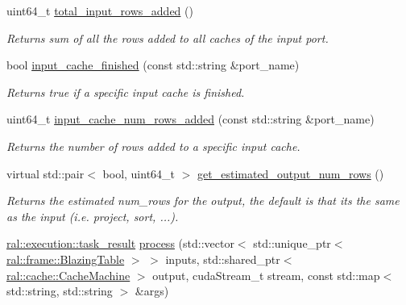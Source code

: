 \begin{DoxyCompactItemize}
\mbox{\label{classral_1_1cache_1_1kernel_a87d2048b2c50e1124eaaed09b3c18758}} 
uint64\+\_\+t \hyperlink{classral_1_1cache_1_1kernel_a87d2048b2c50e1124eaaed09b3c18758}{total\+\_\+input\+\_\+rows\+\_\+added} ()
\begin{DoxyCompactList}\small\item\em Returns sum of all the rows added to all caches of the input port. \end{DoxyCompactList}\item 
bool \hyperlink{classral_1_1cache_1_1kernel_a75d3db3d361445cd14da3186b8b15036}{input\+\_\+cache\+\_\+finished} (const std\+::string \&port\+\_\+name)
\begin{DoxyCompactList}\small\item\em Returns true if a specific input cache is finished. \end{DoxyCompactList}\item 
uint64\+\_\+t \hyperlink{classral_1_1cache_1_1kernel_a25cd1d59552733027ba6396cd9e41004}{input\+\_\+cache\+\_\+num\+\_\+rows\+\_\+added} (const std\+::string \&port\+\_\+name)
\begin{DoxyCompactList}\small\item\em Returns the number of rows added to a specific input cache. \end{DoxyCompactList}\item 
\mbox{\label{classral_1_1cache_1_1kernel_abf40aaa022e3bf38c261977d0c2170cb}} 
virtual std\+::pair$<$ bool, uint64\+\_\+t $>$ \hyperlink{classral_1_1cache_1_1kernel_abf40aaa022e3bf38c261977d0c2170cb}{get\+\_\+estimated\+\_\+output\+\_\+num\+\_\+rows} ()
\begin{DoxyCompactList}\small\item\em Returns the estimated num\+\_\+rows for the output, the default is that its the same as the input (i.\+e. project, sort, ...). \end{DoxyCompactList}\item 
\mbox{\label{classral_1_1cache_1_1kernel_a45abece009eed9fc7555f55ecc55f5dd}} 
\hyperlink{structral_1_1execution_1_1task__result}{ral\+::execution\+::task\+\_\+result} \hyperlink{classral_1_1cache_1_1kernel_a45abece009eed9fc7555f55ecc55f5dd}{process} (std\+::vector$<$ std\+::unique\+\_\+ptr$<$ \hyperlink{classral_1_1frame_1_1BlazingTable}{ral\+::frame\+::\+Blazing\+Table} $>$ $>$ inputs, std\+::shared\+\_\+ptr$<$ \hyperlink{classral_1_1cache_1_1CacheMachine}{ral\+::cache\+::\+Cache\+Machine} $>$ output, cuda\+Stream\+\_\+t stream, const std\+::map$<$ std\+::string, std\+::string $>$ \&args)

\end{DoxyCompactItemize}
